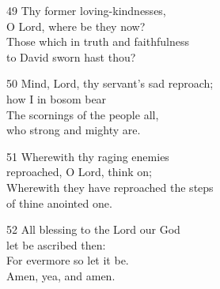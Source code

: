 49 Thy former loving-kindnesses,\\
O Lord, where be they now?\\
Those which in truth and faithfulness\\
to David sworn hast thou?

50 Mind, Lord, thy servant’s sad reproach;\\
how I in bosom bear\\
The scornings of the people all,\\
who strong and mighty are.

51 Wherewith thy raging enemies\\
reproached, O Lord, think on;\\
Wherewith they have reproached the steps\\
of thine anointed one.

52 All blessing to the Lord our God\\
let be ascribed then:\\
For evermore so let it be.\\
Amen, yea, and amen.

\begin{center}
\quad{}\quad{}
\end{center}


